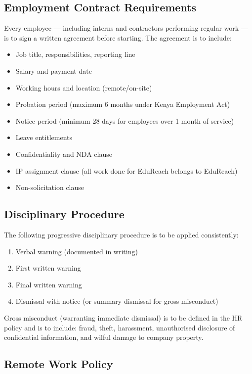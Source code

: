 \documentclass[12pt,a4paper]{article}
\begin{document}
\subsection{Employment Contract Requirements}

Every employee --- including interns and contractors performing regular work --- is to sign a written agreement before starting. The agreement is to include:

\begin{itemize}
  \item Job title, responsibilities, reporting line
  \item Salary and payment date
  \item Working hours and location (remote/on-site)
  \item Probation period (maximum 6 months under Kenya Employment Act)
  \item Notice period (minimum 28 days for employees over 1 month of service)
  \item Leave entitlements
  \item Confidentiality and NDA clause
  \item IP assignment clause (all work done for EduReach belongs to EduReach)
  \item Non-solicitation clause
\end{itemize}

\subsection{Disciplinary Procedure}

The following progressive disciplinary procedure is to be applied consistently:

\begin{enumerate}
  \item Verbal warning (documented in writing)
  \item First written warning
  \item Final written warning
  \item Dismissal with notice (or summary dismissal for gross misconduct)
\end{enumerate}

\noindent Gross misconduct (warranting immediate dismissal) is to be defined in the HR policy and is to include: fraud, theft, harassment, unauthorised disclosure of confidential information, and wilful damage to company property.

\subsection{Remote Work Policy}
\end{document}
